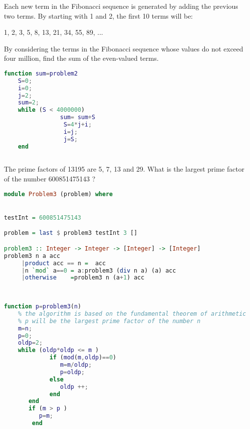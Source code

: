 \begin{problem}
Each new term in the Fibonacci sequence is generated by adding the previous two terms. By starting with 1 and 2, the first 10 terms will be:

1, 2, 3, 5, 8, 13, 21, 34, 55, 89, ...

By considering the terms in the Fibonacci sequence whose values do not exceed four million, find the sum of the even-valued terms.
\end{problem}	
	\begin{solution}

		\begin{lstlisting}[language=Matlab, caption="Matlab"]
function sum=problem2
	S=0;
	i=0;
	j=2;
	sum=2; 
	while (S < 4000000)
	            sum= sum+S
	             S=4*j+i;
	             i=j;
	             j=S;
	end	
            
\end{lstlisting}  

	\end{solution}	
	


\begin{problem}
The prime factors of 13195 are 5, 7, 13 and 29.
What is the largest prime factor of the number 600851475143 ?
\end{problem}	
	\begin{solution}

		\begin{lstlisting}[language=Haskell, caption="Haskell"]
	module Problem3 (problem) where


testInt = 600851475143

problem = last $ problem3 testInt 3 [] 

problem3 :: Integer -> Integer -> [Integer] -> [Integer]
problem3 n a acc
	 |product acc == n =  acc 
	 |n `mod` a==0 = a:problem3 (div n a) (a) acc
	 |otherwise    =problem3 n (a+1) acc
        
\end{lstlisting}  


		\begin{lstlisting}[language=Matlab, caption="Matlab"]
	
function p=problem3(n)
	% the algorithm is based on the fundamental theorem of arithmetic 
	% p will be the largest prime factor of the number n 
	m=n;
	p=0;
	oldp=2;
	while (oldp*oldp <= m )
	         if (mod(m,oldp)==0)
	         	m=m/oldp;
	         	p=oldp;
	         else 
	         	oldp ++;
	         end
	   end
	   if (m > p )
	      p=m;
	    end 
        
\end{lstlisting}  

	\end{solution}	



